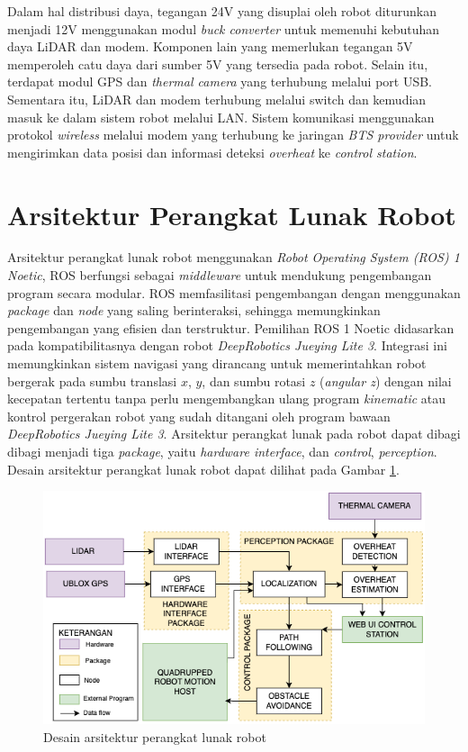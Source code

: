 Dalam hal distribusi daya, tegangan 24V yang disuplai oleh robot diturunkan menjadi 12V menggunakan modul \emph{buck converter} untuk memenuhi kebutuhan daya LiDAR dan modem. Komponen lain yang memerlukan tegangan 5V memperoleh catu daya dari sumber 5V yang tersedia pada robot. Selain itu, terdapat modul GPS dan \emph{thermal camera} yang terhubung melalui port USB. Sementara itu, LiDAR dan modem terhubung melalui switch dan kemudian masuk ke dalam sistem robot melalui LAN. Sistem komunikasi menggunakan protokol \emph{wireless} melalui modem yang terhubung ke jaringan \emph{BTS provider} untuk mengirimkan data posisi dan informasi deteksi \emph{overheat} ke \emph{control station}.

\section{Arsitektur Perangkat Lunak Robot}
Arsitektur perangkat lunak robot menggunakan \emph{Robot Operating System (ROS) 1 Noetic}, ROS berfungsi sebagai \emph{middleware} untuk mendukung pengembangan program secara modular. ROS memfasilitasi pengembangan dengan menggunakan \emph{package} dan \emph{node} yang saling berinteraksi, sehingga memungkinkan pengembangan yang efisien dan terstruktur. Pemilihan ROS 1 Noetic didasarkan pada kompatibilitasnya dengan robot \emph{DeepRobotics Jueying Lite 3}. Integrasi ini memungkinkan sistem navigasi yang dirancang untuk memerintahkan robot bergerak pada sumbu translasi \(x\), \(y\), dan sumbu rotasi \(z\) (\emph{angular z}) dengan nilai kecepatan tertentu tanpa perlu mengembangkan ulang program \emph{kinematic} atau kontrol pergerakan robot yang sudah ditangani oleh program bawaan \emph{DeepRobotics Jueying Lite 3}. Arsitektur perangkat lunak pada robot dapat dibagi dibagi menjadi tiga \emph{package}, yaitu \emph{hardware interface}, dan \emph{control}, \emph{perception}. Desain arsitektur perangkat lunak robot dapat dilihat pada Gambar \ref{fig:Desain perangkat lunak robot}.

\begin{figure}[H] \centering
  \includegraphics[scale=0.7]{gambar/software.png}
  \caption{Desain arsitektur perangkat lunak robot} 
  \label{fig:Desain perangkat lunak robot}
\end{figure}

